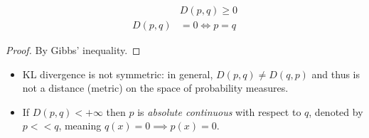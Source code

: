 \documentclass[toc, titlepaged]{../cs-classes/cs-classes}
\begin{document}
\begin{property}[Positivity]
    \begin{equation*}
        \begin{aligned}
        &D(p, q) \geq 0\\
        D(p, q) &= 0\iff p=q
        \end{aligned}
    \end{equation*}
\end{property}
\begin{proof}
    By Gibbs' inequality.
\end{proof}

\begin{remark}
    \leavevmode
    \begin{itemize}
        \item KL divergence is not symmetric: in general, $D(p, q)\neq D(q, p)$ and thus is not a distance (metric) on the space of probability measures.
        \item If $D(p, q)<+\infty$ then $p$ is \emph{absolute continuous} with respect to $q$, denoted by $p << q$, meaning $q(x)=0 \implies p(x)=0$.
    \end{itemize}
\end{remark}
\end{document}
